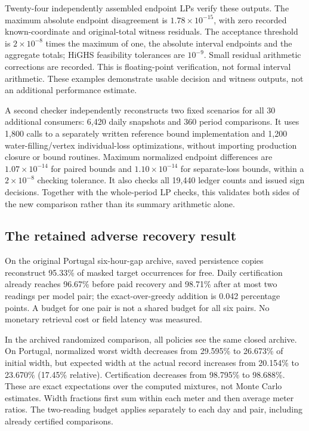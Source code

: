 Twenty-four independently assembled endpoint LPs verify these outputs.
The maximum absolute endpoint disagreement is $1.78\times10^{-15}$,
with zero recorded known-coordinate and original-total witness residuals.
The acceptance threshold is $2\times10^{-8}$ times the maximum of one,
the absolute interval endpoints and the aggregate totals; HiGHS feasibility
tolerances are $10^{-9}$. Small residual arithmetic corrections are recorded.
This is floating-point verification,
not formal interval arithmetic. These examples demonstrate usable
decision and witness outputs, not an additional performance estimate.

A second checker independently reconstructs two fixed scenarios for all
30 additional consumers: 6,420 daily snapshots and 360 period comparisons.
It uses 1,800 calls to a separately written reference bound implementation
and 1,200 water-filling/vertex individual-loss optimizations, without
importing production closure or bound routines. Maximum normalized
endpoint differences are $1.07\times10^{-14}$ for paired bounds and
$1.10\times10^{-14}$ for separate-loss bounds, within a $2\times10^{-8}$
checking tolerance. It also checks all 19,440 ledger counts and issued
sign decisions. Together with the whole-period LP checks, this validates
both sides of the new comparison rather than its summary arithmetic alone.
\FloatBarrier
\subsection{The retained adverse recovery result}
On the original Portugal six-hour-gap archive, saved persistence copies
reconstruct 95.33\% of masked target occurrences for free. Daily certification
already reaches 96.67\% before paid recovery and 98.71\% after at most two
readings per model pair; the exact-over-greedy addition is 0.042 percentage
points. A budget for one pair is not a shared budget for all six pairs.
No monetary retrieval cost or field latency was measured.

In the archived randomized comparison, all policies see the same closed
archive. On Portugal, normalized worst width decreases from 29.595\% to
26.673\% of initial width, but expected width at the actual record increases
from 20.154\% to 23.670\% (17.45\% relative). Certification decreases
from 98.795\% to 98.688\%. These are exact expectations over the computed
mixtures, not Monte Carlo estimates. Width fractions first sum within
each meter and then average meter ratios. The two-reading budget applies
separately to each day and pair, including already certified comparisons.

